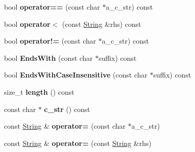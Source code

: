 \begin{DoxyCompactItemize}
\item 
\mbox{\label{classtesting_1_1internal_1_1_string_a8e9850cc90a976d6647569e7d75b9cdd}} 
bool {\bfseries operator==} (const char $\ast$a\+\_\+c\+\_\+str) const
\item 
\mbox{\label{classtesting_1_1internal_1_1_string_ac402ccdd87102a4b768991d15c920cf8}} 
bool {\bfseries operator$<$} (const \mbox{\hyperlink{classtesting_1_1internal_1_1_string}{String}} \&rhs) const
\item 
\mbox{\label{classtesting_1_1internal_1_1_string_a10d51d359c57ad6f73ad50815b935dab}} 
bool {\bfseries operator!=} (const char $\ast$a\+\_\+c\+\_\+str) const
\item 
\mbox{\label{classtesting_1_1internal_1_1_string_aaee661db5f9ef50c3f968a3bc7ff6977}} 
bool {\bfseries Ends\+With} (const char $\ast$suffix) const
\item 
\mbox{\label{classtesting_1_1internal_1_1_string_a7eb24f88f83f18f327da736f1e173363}} 
bool {\bfseries Ends\+With\+Case\+Insensitive} (const char $\ast$suffix) const
\item 
\mbox{\label{classtesting_1_1internal_1_1_string_aff9a976b633729a43a7cc40ed06c9f74}} 
size\+\_\+t {\bfseries length} () const
\item 
\mbox{\label{classtesting_1_1internal_1_1_string_a47bee0bd38ea85dae6b969ac1041683e}} 
const char $\ast$ {\bfseries c\+\_\+str} () const
\item 
\mbox{\label{classtesting_1_1internal_1_1_string_ae87fe1b30ac9b540adeb1b58d1aa7fc0}} 
const \mbox{\hyperlink{classtesting_1_1internal_1_1_string}{String}} \& {\bfseries operator=} (const char $\ast$a\+\_\+c\+\_\+str)
\item 
\mbox{\label{classtesting_1_1internal_1_1_string_a6cb2c268109614bd322803bb59984f23}} 
const \mbox{\hyperlink{classtesting_1_1internal_1_1_string}{String}} \& {\bfseries operator=} (const \mbox{\hyperlink{classtesting_1_1internal_1_1_string}{String}} \&rhs)
\end{DoxyCompactItemize}
